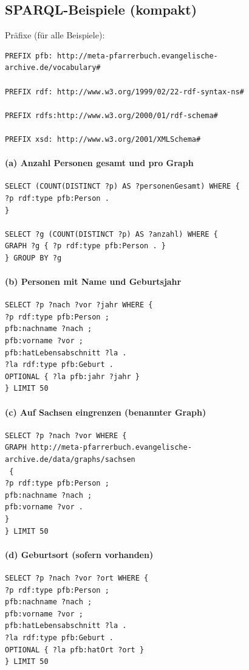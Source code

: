 \subsection{SPARQL-Beispiele (kompakt)}
\noindent Präfixe (für alle Beispiele):
\begin{verbatim}
PREFIX pfb: http://meta-pfarrerbuch.evangelische-archive.de/vocabulary#

PREFIX rdf: http://www.w3.org/1999/02/22-rdf-syntax-ns#

PREFIX rdfs:http://www.w3.org/2000/01/rdf-schema#

PREFIX xsd: http://www.w3.org/2001/XMLSchema#

\end{verbatim}

\paragraph{(a) Anzahl Personen gesamt und pro Graph}
\begin{verbatim}
SELECT (COUNT(DISTINCT ?p) AS ?personenGesamt) WHERE {
?p rdf:type pfb:Person .
}

SELECT ?g (COUNT(DISTINCT ?p) AS ?anzahl) WHERE {
GRAPH ?g { ?p rdf:type pfb:Person . }
} GROUP BY ?g
\end{verbatim}

\paragraph{(b) Personen mit Name und Geburtsjahr}
\begin{verbatim}
SELECT ?p ?nach ?vor ?jahr WHERE {
?p rdf:type pfb:Person ;
pfb:nachname ?nach ;
pfb:vorname ?vor ;
pfb:hatLebensabschnitt ?la .
?la rdf:type pfb:Geburt .
OPTIONAL { ?la pfb:jahr ?jahr }
} LIMIT 50
\end{verbatim}

\paragraph{(c) Auf Sachsen eingrenzen (benannter Graph)}
\begin{verbatim}
SELECT ?p ?nach ?vor WHERE {
GRAPH http://meta-pfarrerbuch.evangelische-archive.de/data/graphs/sachsen
 {
?p rdf:type pfb:Person ;
pfb:nachname ?nach ;
pfb:vorname ?vor .
}
} LIMIT 50
\end{verbatim}

\paragraph{(d) Geburtsort (sofern vorhanden)}
\begin{verbatim}
SELECT ?p ?nach ?vor ?ort WHERE {
?p rdf:type pfb:Person ;
pfb:nachname ?nach ;
pfb:vorname ?vor ;
pfb:hatLebensabschnitt ?la .
?la rdf:type pfb:Geburt .
OPTIONAL { ?la pfb:hatOrt ?ort }
} LIMIT 50
\end{verbatim}

